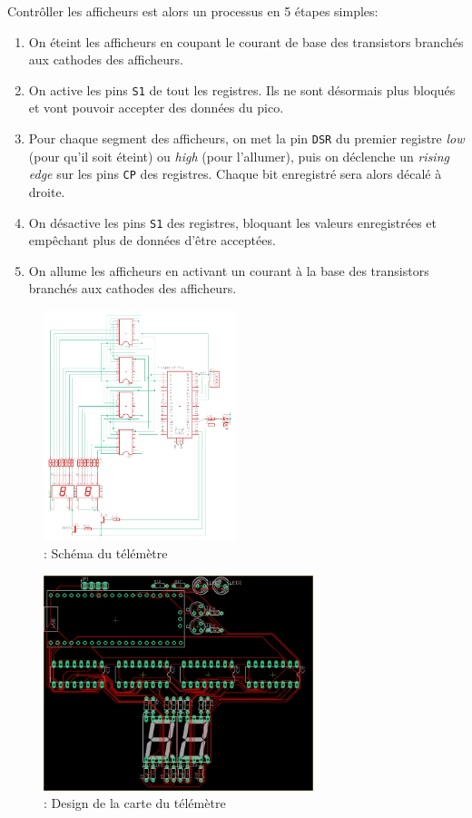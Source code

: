 \documentclass[a4paper,12pt]{scrartcl}
\begin{document}
Contrôller les afficheurs est alors un processus en 5 étapes simples:
\begin{enumerate}
  \item On éteint les afficheurs en coupant le courant de base des transistors
    branchés aux cathodes des afficheurs.
  \item On active les pins \texttt{S1}
    de tout les registres. Ils ne sont désormais plus bloqués et vont pouvoir
    accepter des données du pico.
  \item Pour chaque segment des afficheurs,
    on met la pin \texttt{DSR} du premier registre \textit{low} (pour qu'il
    soit éteint) ou \textit{high} (pour l'allumer), puis on déclenche un
    \textit{rising edge} sur les pins \texttt{CP} des registres. Chaque bit
    enregistré sera alors décalé à droite.
  \item On désactive les pins \texttt{S1} des registres, bloquant les valeurs
    enregistrées et empêchant plus de données d'être acceptées.
  \item On allume les afficheurs en activant un courant à la base des
    transistors branchés aux cathodes des afficheurs.
\end{enumerate}

\begin{figure}
  \centering
  \includegraphics[width=0.5\textwidth]{sonic-telemeter-schematic.png}
  \caption{\label{fig:schematic}: Schéma du télémètre}
\end{figure}

\begin{figure}
  \centering
  \includegraphics[width=0.7\textwidth]{sonic-telemeter-board.png}
  \caption{\label{fig:board}: Design de la carte du télémètre}
\end{figure}
\end{document}
